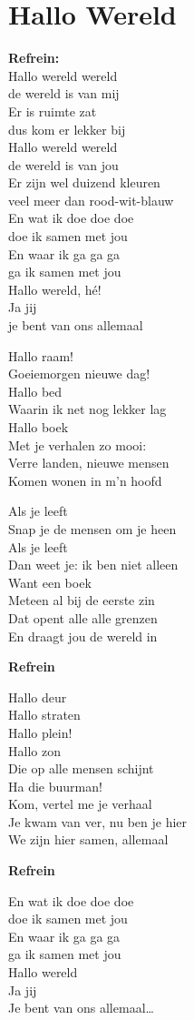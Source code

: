 \section{Hallo Wereld}
\textbf{Refrein:}\\
Hallo wereld wereld\\
de wereld is van mij\\
Er is ruimte zat\\
dus kom er lekker bij\\
Hallo wereld wereld\\
de wereld is van jou\\
Er zijn wel duizend kleuren\\
veel meer dan rood-wit-blauw\\
En wat ik doe doe doe\\
doe ik samen met jou\\
En waar ik ga ga ga\\
ga ik samen met jou\\
Hallo wereld, hé!\\
Ja jij\\
je bent van ons allemaal

Hallo raam!\\
Goeiemorgen nieuwe dag!\\
Hallo bed\\
Waarin ik net nog lekker lag\\
Hallo boek\\
Met je verhalen zo mooi:\\
Verre landen, nieuwe mensen\\
Komen wonen in m’n hoofd

Als je leeft\\
Snap je de mensen om je heen\\
Als je leeft\\
Dan weet je: ik ben niet alleen\\
Want een boek\\
Meteen al bij de eerste zin\\
Dat opent alle alle grenzen\\
En draagt jou de wereld in

\textbf{Refrein}

Hallo deur\\
Hallo straten\\
Hallo plein!\\
Hallo zon\\
Die op alle mensen schijnt\\
Ha die buurman!\\
Kom, vertel me je verhaal\\
Je kwam van ver, nu ben je hier\\
We zijn hier samen, allemaal

\textbf{Refrein}

En wat ik doe doe doe\\
doe ik samen met jou\\
En waar ik ga ga ga\\
ga ik samen met jou\\
Hallo wereld\\
Ja jij\\
Je bent van ons allemaal…